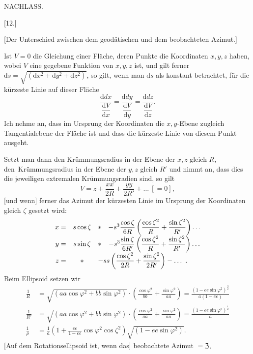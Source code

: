 \clearpage
{}\hfill NACHLASS.\hfill\mbox{}\par
\begin{center}[12.]\end{center}
\begin{center}[Der Unterschied zwischen dem geodätischen und dem beobachteten Azimut.]\end{center}
Ist $V=0$ die Gleichung einer Fläche, deren Punkte die Koordinaten $x,y,z$ haben, wobei $V$ eine gegebene Funktion von $x,y,z$ ist, und gilt ferner $\mathrm ds=\sqrt{(\mathrm dx^2+\mathrm dy^2+\mathrm dz^2)}$, so gilt, wenn man $\mathrm ds$ als konstant betrachtet, für die kürzeste Linie auf dieser Fläche
\[
\frac{\mathrm ddx}{\dfrac{\mathrm dV}{\mathrm dx}}=\frac{\mathrm ddy}{\dfrac{\mathrm dV}{\mathrm dy}}=\frac{\mathrm ddz}{\dfrac{\mathrm dV}{\mathrm dz}}.
\]
Ich nehme an, dass im Ursprung der Koordinaten die $x,y$-Ebene zugleich Tangentialebene der Fläche ist und dass die kürzeste Linie von diesem Punkt ausgeht.

Setzt man dann den Krümmungsradius in der Ebene der $x,z$ gleich $R$, den\textperiodcentered\ Krümmungsradius in der Ebene der $y,z$ gleich $R'$ und nimmt an, dass dies die jeweiligen extremalen Krümmungsradien sind, so gilt
\[
V=z+\frac{xx}{2R}+\frac{yy}{2R'}+\ldots\ [=0],
\]
[und wenn] ferner das Azimut der kürzesten Linie im Ursprung der Koordinaten gleich $\zeta$ gesetzt wird:
\[
\begin{array}{rclcl}
x=&s\cos\zeta&*&-s^3\dfrac{\cos\zeta}{6R}\left(\dfrac{\cos\zeta^2}{R}+\dfrac{\sin\zeta^2}{R'}\right)\ldots\\[4pt]
y=&s\sin\zeta&*&-s^3\dfrac{\sin\zeta}{6R'}\left(\dfrac{\cos\zeta^2}{R}+\dfrac{\sin\zeta^2}{R'}\right)\ldots\\[4pt]
z=&*&\multicolumn{2}{l}{-ss\left(\dfrac{\cos\zeta^2}{2R}+\dfrac{\sin\zeta^2}{2R'}\right)-\ldots\ .}
\end{array}
\]
Beim Ellipsoid setzen wir
\[
\begin{aligned}
\frac1R&=\sqrt{(aa\cos\varphi^2+bb\sin\varphi^2)}\cdot\left(\frac{\cos\varphi^2}{bb}+\frac{\sin\varphi^2}{aa}\right)=\frac{(1-ee\sin\varphi^2)^{\frac32}}{a(1-ee)}\\
\frac1{R'}&=\sqrt{(aa\cos\varphi^2+bb\sin\varphi^2)}\cdot\left(\frac{\cos\varphi^2}{aa}+\frac{\sin\varphi^2}{aa}\right)=\frac{(1-ee\sin\varphi^2)^{\frac12}}a\\
\frac1\rho&=\frac1a\left(1+\frac{ee}{1-ee}\cos\varphi^2\cos\zeta^2\right)\sqrt{(1-ee\sin\varphi^2)}.
\end{aligned}
\]
[Auf dem Rotationsellipsoid ist, wenn das] beobachtete Azimut $=\mathfrak Z$,

